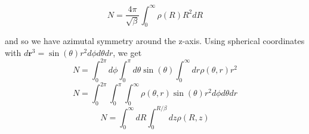\documentclass[
    a4paper, aps, twocolumn, floatfix, superscriptaddress,
    nofootinbib]{revtex4-1}
\begin{document}
\begin{appendices}
\begin{equation}
    N = \frac{4\pi}{\sqrt{\beta}}\int_0^{\infty} \rho(R) R^2 dR  
\end{equation}


and so we have azimutal symmetry around the z-axis. Using spherical coordinates with $d\boldsymbol{r}^3=\sin(\theta) r^2 d\phi d \theta dr$, we get
\begin{equation}
    N = \int_0^{2\pi} d\phi \int_0^{\pi}d\theta \sin(\theta)  \int_0^{\infty}dr \rho(\theta,r) r^2
\end{equation}
\begin{equation}
    N = \int_0^{2\pi}  \int_0^{\pi}  \int_0^{\infty}\rho(\theta,r) \sin(\theta)r^2d\phi d\theta dr 
\end{equation}
\begin{equation}
    N = \int_0^{\infty} dR \int_0^{R/\beta}dz \rho(R,z)
\end{equation}
\fi

\end{appendices}
\end{document}
